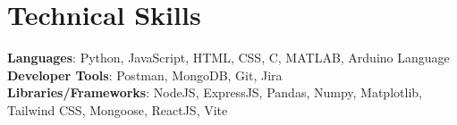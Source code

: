 \documentclass[letterpaper,11pt]{article}
\begin{document}
\section{Technical Skills}
 \begin{itemize}[leftmargin=0.15in, label={}]
    \small{\item{   
     \textbf{Languages}{: Python, JavaScript, HTML, CSS, C, MATLAB, Arduino Language} \\[1mm]
     \textbf{Developer Tools}{: Postman, MongoDB, Git, Jira} \\[1mm]
     \textbf{Libraries/Frameworks}{: NodeJS, ExpressJS, Pandas, Numpy, Matplotlib, Tailwind CSS, Mongoose, ReactJS, Vite} \\ [1mm]
    }}
 \end{itemize}
 \vspace{-16pt}
 \vspace{3pt}
\vspace{10pt}

\vspace{-15pt}
\end{document}
